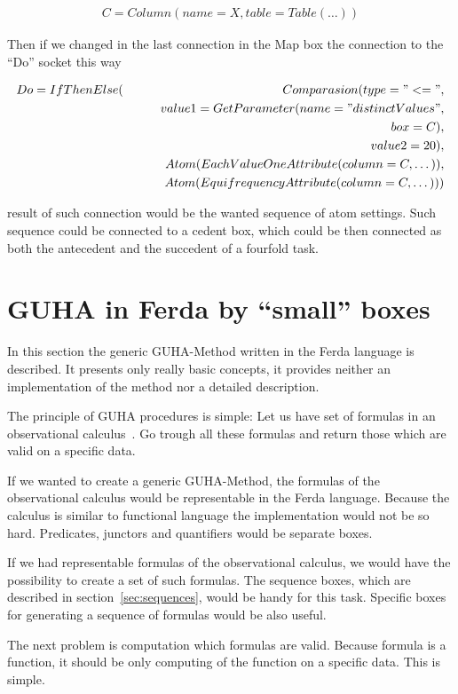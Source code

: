 \documentclass[a4paper,12pt]{book}
\begin{document}
\begin{eqnarray*}
C=Column(name=X, table=Table(\dots))
\end{eqnarray*}

Then if we changed in the last connection in the Map box the connection to the ``Do'' socket this way

\begin{eqnarray*}
Do=IfThenElse(&&Comparasion(type="<=", \\&&\qquad value1=GetParameter(name="distinctValues", \\&&\qquad\qquad box=C), \\&&\qquad value2=20),\\&&Atom(EachValueOneAttribute(column=C,\dots)),\\&&Atom(EquifrequencyAttribute(column=C,\dots)))
\end{eqnarray*}

result of such connection would be the wanted sequence of atom settings. Such sequence could be connected to a cedent box, which could be then connected as both the antecedent and the succedent of a fourfold task.

\section{GUHA in Ferda by ``small'' boxes}
In this section the generic GUHA-Method written in the Ferda language is described. It presents only really basic concepts, it provides neither an implementation of the method nor a detailed description.

The principle of GUHA procedures is simple: Let us have set of formulas in an observational calculus~\cite{GUHAbook}. Go trough all these formulas and return those which are valid on a specific data.

If we wanted to create a generic GUHA-Method, the formulas of the observational calculus would be representable in the Ferda language. Because the calculus is similar to functional language the implementation would not be so hard. Predicates, junctors and quantifiers would be separate boxes.

If we had representable formulas of the observational calculus, we would have the possibility to create a set of such formulas. The sequence boxes, which are described in section~\ref{sec:sequences}, would be handy for this task. Specific boxes for generating a sequence of formulas would be also useful.

The next problem is computation which formulas are valid. Because formula is a function, it should be only computing of the function on a specific data. This is simple.
\end{document}

